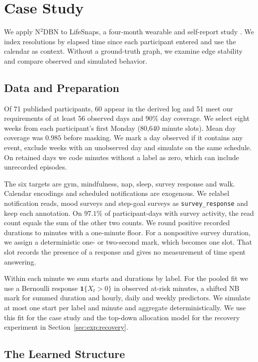 \documentclass[sigconf]{acmart}
\begin{document}
\section{Case Study}
\label{sec:case-study}

We apply N$^2$DBN to LifeSnaps, a four-month wearable and self-report study \citep{yfantidou_lifesnaps_2022}. We index resolutions by elapsed time since each participant entered and use the calendar as context. Without a ground-truth graph, we examine edge stability and compare observed and simulated behavior.

\subsection{Data and Preparation}
\label{sec:case-study:data}

Of 71 published participants, 60 appear in the derived log and 51 meet our requirements of at least 56 observed days and 90\% day coverage. We select eight weeks from each participant's first Monday (80,640 minute slots). Mean day coverage was \(0.985\) before masking. We mark a day observed if it contains any event, exclude weeks with an unobserved day and simulate on the same schedule. On retained days we code minutes without a label as zero, which can include unrecorded episodes.

The six targets are gym, mindfulness, nap, sleep, survey response and walk. Calendar encodings and scheduled notifications are exogenous. We relabel notification reads, mood surveys and step-goal surveys as \texttt{survey\_response} and keep each annotation. On \(97.1\%\) of participant-days with survey activity, the read count equals the sum of the other two counts. We round positive recorded durations to minutes with a one-minute floor. For a nonpositive survey duration, we assign a deterministic one- or two-second mark, which becomes one slot. That slot records the presence of a response and gives no measurement of time spent answering.

Within each minute we sum starts and durations by label. For the pooled fit we use a Bernoulli response \(\mathbf 1\{X_t>0\}\) in observed at-risk minutes, a shifted NB mark for summed duration and hourly, daily and weekly predictors. We simulate at most one start per label and minute and aggregate deterministically. We use this fit for the case study and the top-down allocation model for the recovery experiment in Section~\ref{sec:exp:recovery}.

\subsection{The Learned Structure}
\label{sec:case-study:structure}
\end{document}
